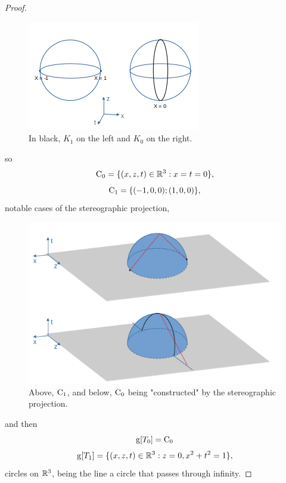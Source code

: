 \begin{proof}
\begin{figure}[H]
    \centering
    \includegraphics[scale=0.50]{K0K1.png}
    \caption{In black, $K_1$ on the left and $K_0$ on the right.}
    \label{fig:K0K1}
\end{figure}

so
 \begin{equation*}
    \operatorname{C}_0=\{(x,z,t) \in \mathbb{R}^3 : x=t=0\}, 
 \end{equation*}
 \begin{equation*}
    \operatorname{C}_1=\{(-1,0,0); (1,0,0)\}, 
 \end{equation*}
 notable cases of the stereographic projection,
 
 \begin{figure}[H]
    \centering
    \includegraphics[scale=0.50]{C0C1.png}
    \caption{Above, $\operatorname{C}_1$, and below, $\operatorname{C}_0$ being "constructed" by the stereographic projection.}
    \label{fig:C0C1}
\end{figure}
 
 and then
 \begin{equation*}
 \operatorname{g}[T_0]=\operatorname{C}_0
 \end{equation*}
 \begin{equation*}
 \operatorname{g}[T_1]=\{(x,z,t) \in \mathbb{R}^3 : z=0, x^2+t^2=1\},
 \end{equation*}
 circles on $\mathbb{R}^3$, being the line a circle that passes through infinity.


\end{proof}
